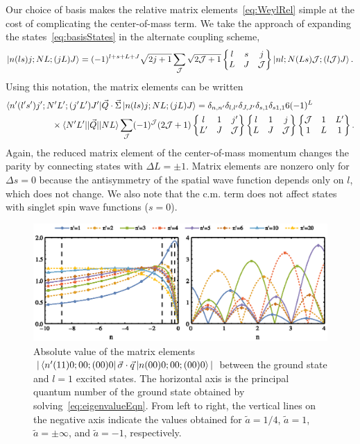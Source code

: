 Our choice of basis makes the relative matrix elements~\eqref{eq:WeylRel} simple at the cost of complicating the center-of-mass term. We take the approach of expanding the states~\eqref{eq:basisStates} in the alternate coupling scheme,
\begin{equation}\label{eq:basisStates2}
\ket{n(ls)j;NL;(jL)J}=(-1)^{l+s+L+J}\sqrt{2j+1}\sum_{\mathcal{J}}\sqrt{2\mathcal{J}+1}\begin{Bmatrix} l & s & j \\ L & J & \mathcal{J} \end{Bmatrix}\ket{nl;N(Ls)\mathcal{J};(l\mathcal{J})J}.
\end{equation}
Using this notation, the matrix elements can be written
\begin{equation}\begin{split}
\bra{n'(l's')j';N'L';(j'L')J'}&\vec{Q}\cdot\vec{\Sigma} \ket{n(ls)j;NL;(jL)J} = \delta_{n,n'}\delta_{l,l'}\delta_{J,J'}\delta_{s,1}\delta_{s1,1}   6 (-1)^{L} \\
&\hspace{-2cm}\times\braket{N'L'|| \vec{Q} || NL} \sum_{\mathcal{J}}(-1)^\mathcal{J} (2\mathcal{J}+1)\sixj{l}{1}{j'}{L'}{J}{\mathcal{J}}\sixj{l}{1}{j}{L}{J}{\mathcal{J}}\sixj{\mathcal{J}}{1}{L'}{1}{L}{1}.
\end{split}
\end{equation}
Again, the reduced matrix element of the center-of-mass momentum changes the parity by connecting states with $\Delta L=\pm1$. Matrix elements are nonzero only for $\Delta s=0$ because the antisymmetry of the spatial wave function depends only on $l$, which does not change. We also note that the c.m. term does not affect states with singlet spin wave functions ($s=0$).


\begin{figure}
\centering
\includegraphics{SOC/Figures/MatrixElts}
\caption[Coupling of ground state to $l=1$ states for the Weyl spin-orbit Hamiltonian]{\label{fig:matrixElts}Absolute value of the matrix elements $|\bra{n'(11)0;00;(00)0}\vec{\sigma}\cdot\vec{q}\ket{n(00)0;00;(00)0}|$ between the ground state and $l=1$ excited states. The horizontal axis is the principal quantum number of the ground state obtained by solving~\eqref{eq:eigenvalueEqn}. From left to right, the vertical lines on the negative axis indicate the values obtained for $\tilde{a}=1/4$, $\tilde{a}=1$, $\tilde{a}=\pm\infty$, and $\tilde{a}=-1$, respectively.} 
\end{figure}

